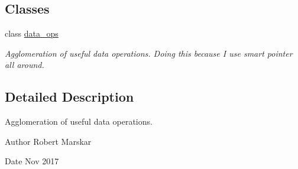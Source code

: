 \subsection*{Classes}
\begin{DoxyCompactItemize}
\item 
class \hyperlink{classdata__ops}{data\+\_\+ops}
\begin{DoxyCompactList}\small\item\em Agglomeration of useful data operations. Doing this because I use smart pointer all around. \end{DoxyCompactList}\end{DoxyCompactItemize}


\subsection{Detailed Description}
Agglomeration of useful data operations. 

\begin{DoxyAuthor}{Author}
Robert Marskar 
\end{DoxyAuthor}
\begin{DoxyDate}{Date}
Nov 2017 
\end{DoxyDate}
